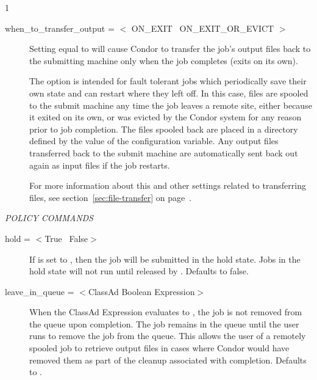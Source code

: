 \begin{ManPage}{\label{man-condor-submit}}{1}
\begin{description}

\item[when\_to\_transfer\_output = $<$ ON\_EXIT \Bar\ ON\_EXIT\_OR\_EVICT $>$] 

Setting  equal to  will
cause Condor to transfer the job's output files back to the submitting
machine only when the job completes (exits on its own).

The  option is intended for fault tolerant
jobs which periodically save their own state and can restart where
they left off.
In this case, files are spooled to the submit machine any time the
job leaves a remote site, either because it exited on its own, or was
evicted by the Condor system for any reason prior to job completion.
The files spooled back are placed in a directory defined by
the value of the  configuration variable.
Any output files transferred back to the submit machine are
automatically sent back out again as input files if the job restarts.

For more information about this and other settings related to
transferring files, see section~\ref{sec:file-transfer} on
page~\pageref{sec:file-transfer}.

\end{description} 

\emph{POLICY COMMANDS}
\begin{description} 


\item[hold = $<$True \Bar\ False$>$] If  is set to
, then the job will be submitted in the hold state.  Jobs in
the hold state will not run until released by .
Defaults to false.


\item[leave\_in\_queue = $<$ClassAd Boolean Expression$>$]
When the ClassAd Expression evaluates to , the job is
not removed from the queue upon completion.
The job remains in the queue until the user runs 
to remove the job from the queue.
This allows the user of a remotely spooled job to retrieve output
files in cases where Condor would have removed them as part of
the cleanup associated with completion.
Defaults to .


\end{description}
\end{ManPage}
